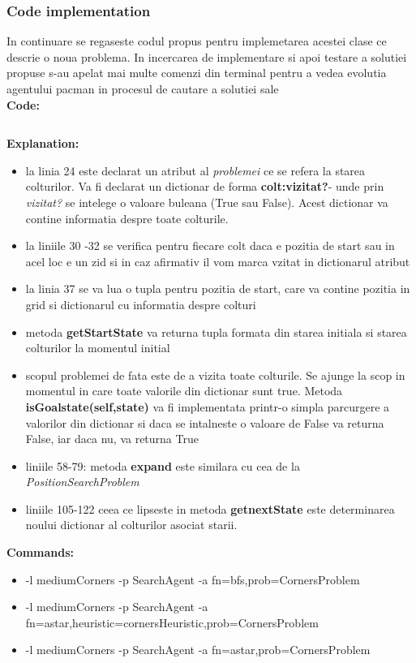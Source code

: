 \subsubsection{Code implementation}
In continuare se regaseste codul propus pentru implemetarea acestei clase ce descrie o noua problema. In incercarea de implementare si apoi testare a solutiei propuse s-au apelat mai multe comenzi din terminal pentru a vedea evolutia agentului pacman in procesul de cautare a solutiei sale \\

\textbf{Code:}

\inputminted[linenos]{python}{code/05_corner_problem.py}


\textbf{Explanation:}
\begin{itemize}
    \setlength\itemsep{0em}
    \item  la linia 24 este declarat un atribut al \textit{problemei} ce se refera la starea colturilor. Va fi declarat un dictionar de forma \textbf{colt:vizitat?}- unde prin \textit{vizitat?} se intelege o valoare buleana (True sau False). Acest dictionar va contine informatia despre toate colturile.
    \item la liniile 30 -32 se verifica pentru fiecare colt daca e pozitia de start sau in acel loc e un zid si in caz afirmativ il vom marca vzitat in dictionarul atribut
    \item la linia 37 se va lua o tupla pentru pozitia de start, care va contine pozitia in grid si dictionarul cu informatia despre colturi
    \item metoda \textbf{getStartState} va returna tupla formata din starea initiala si starea colturilor la momentul initial
    \item scopul problemei de fata este de a vizita toate colturile. Se ajunge la scop in momentul in care toate valorile din dictionar sunt true. Metoda \textbf{isGoalstate(self,state)} va fi implementata printr-o simpla parcurgere a valorilor din dictionar si daca se intalneste o valoare de False va returna False, iar daca nu, va returna True
    \item liniile 58-79: metoda \textbf{expand} este similara cu cea de la \textit{PositionSearchProblem} 
    \item liniile 105-122 ceea ce lipseste in metoda \textbf{getnextState} este determinarea noului dictionar al colturilor asociat starii.
\end{itemize}

\textbf{Commands:}
\begin{itemize}
    \setlength\itemsep{0em}
    \item  -l mediumCorners -p SearchAgent -a fn=bfs,prob=CornersProblem
    \item  -l mediumCorners -p SearchAgent -a fn=astar,heuristic=cornersHeuristic,prob=CornersProblem
    \item   -l mediumCorners -p SearchAgent -a fn=astar,prob=CornersProblem
\end{itemize}
